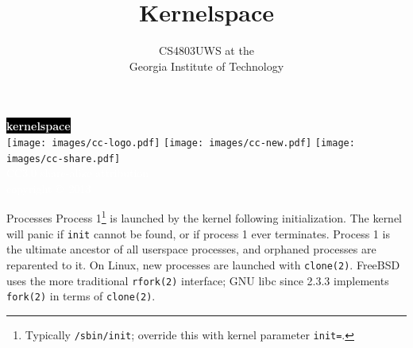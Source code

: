 \documentclass[mathserif,xcolor={dvipsnames,table}]{beamer}
\title{\textbf{Kernelspace}}
\date{}
\author{CS4803UWS at the\\
Georgia Institute of Technology
}
\begin{document}
{
%
\begin{frame}[plain]
\textcolor{white}{
%
\colorbox{black}{\textbf{kernelspace}}
}
\vspace{2.7in}
\\
\hfill\texttt{[image: images/cc-logo.pdf]}
\texttt{[image: images/cc-new.pdf]}
\texttt{[image: images/cc-share.pdf]}
\textcolor{white}{
\\
\hfill \tiny{CC3.0 share-alike attribution}\\
}
\textcolor{white}{
\hfill \scriptsize{copyright \copyright\ 2013}\\
}
\end{frame}
}

\begin{frame}{Processes}
Process 1\footnote{\tiny{Typically {\tt /sbin/init}; override this with kernel parameter {\tt init=}.}} is launched by the
kernel following initialization. The kernel will panic if {\tt init} cannot be found,
or if process 1 ever terminates. Process 1 is the ultimate ancestor of all userspace
processes, and orphaned processes are reparented to it.
\vfill
On Linux, new processes are launched with {\tt clone(2)}. FreeBSD uses the more
traditional {\tt rfork(2)} interface; GNU libc since 2.3.3 implements {\tt fork(2)}
in terms of {\tt clone(2)}.
\end{frame}
\end{document}
